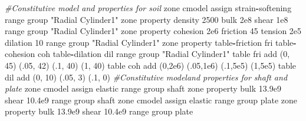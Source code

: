 \documentclass[a4paper, nobind]{templates/ociamthesis}
\newenvironment{Shaded}{\begin{snugshade}}{\end{snugshade}}
\newcommand{\BuiltInTok}[1]{#1}
\newcommand{\CommentTok}[1]{\textcolor[rgb]{0.56,0.35,0.01}{\textit{#1}}}
\newcommand{\DecValTok}[1]{\textcolor[rgb]{0.00,0.00,0.81}{#1}}
\newcommand{\FloatTok}[1]{\textcolor[rgb]{0.00,0.00,0.81}{#1}}
\newcommand{\NormalTok}[1]{#1}
\newcommand{\OperatorTok}[1]{\textcolor[rgb]{0.81,0.36,0.00}{\textbf{#1}}}
\newcommand{\StringTok}[1]{\textcolor[rgb]{0.31,0.60,0.02}{#1}}
\renewenvironment{Shaded}
{
  \vspace{10pt}%
  \begin{snugshade}%
}{%
  \end{snugshade}%
  \vspace{8pt}%
}
\begin{document}
\begin{Shaded}
\begin{Highlighting}[]
\CommentTok{\#Constitutive model and properties for soil}
\NormalTok{zone cmodel assign strain}\OperatorTok{{-}}\NormalTok{softening }\BuiltInTok{range}\NormalTok{ group }\StringTok{"Radial Cylinder1"}
\NormalTok{zone }\BuiltInTok{property}\NormalTok{ density }\DecValTok{2500}\NormalTok{ bulk }\FloatTok{2e8}\NormalTok{ shear }\FloatTok{1e8} \BuiltInTok{range}\NormalTok{ group }\StringTok{"Radial Cylinder1"}
\NormalTok{zone }\BuiltInTok{property}\NormalTok{ cohesion }\FloatTok{2e6}\NormalTok{ friction }\DecValTok{45}\NormalTok{ tension }\FloatTok{2e5}\NormalTok{ dilation }\DecValTok{10} \BuiltInTok{range}\NormalTok{ group }\StringTok{"Radial Cylinder1"}
\NormalTok{zone }\BuiltInTok{property}\NormalTok{ table}\OperatorTok{{-}}\NormalTok{friction }\StringTok{\textquotesingle{}fri\textquotesingle{}}\NormalTok{ table}\OperatorTok{{-}}\NormalTok{cohesion }\StringTok{\textquotesingle{}coh\textquotesingle{}}\NormalTok{ table}\OperatorTok{{-}}\NormalTok{dilation }\StringTok{\textquotesingle{}dil\textquotesingle{}} \BuiltInTok{range}\NormalTok{ group }\StringTok{"Radial Cylinder1"}
\NormalTok{table }\StringTok{\textquotesingle{}fri\textquotesingle{}}\NormalTok{ add (}\DecValTok{0}\NormalTok{, }\DecValTok{45}\NormalTok{) (}\FloatTok{.05}\NormalTok{, }\DecValTok{42}\NormalTok{) (}\FloatTok{.1}\NormalTok{, }\DecValTok{40}\NormalTok{) (}\DecValTok{1}\NormalTok{, }\DecValTok{40}\NormalTok{)}
\NormalTok{table }\StringTok{\textquotesingle{}coh\textquotesingle{}}\NormalTok{ add (}\DecValTok{0}\NormalTok{,}\FloatTok{2e6}\NormalTok{) (}\FloatTok{.05}\NormalTok{,}\FloatTok{1e6}\NormalTok{) (}\FloatTok{.1}\NormalTok{,}\FloatTok{5e5}\NormalTok{) (}\DecValTok{1}\NormalTok{,}\FloatTok{5e5}\NormalTok{) }
\NormalTok{table }\StringTok{\textquotesingle{}dil\textquotesingle{}}\NormalTok{ add (}\DecValTok{0}\NormalTok{, }\DecValTok{10}\NormalTok{) (}\FloatTok{.05}\NormalTok{,  }\DecValTok{3}\NormalTok{) (}\FloatTok{.1}\NormalTok{,  }\DecValTok{0}\NormalTok{) }
\CommentTok{\#Constitutive modeland properties for shaft and plate}
\NormalTok{zone cmodel assign elastic }\BuiltInTok{range}\NormalTok{ group }\StringTok{\textquotesingle{}shaft\textquotesingle{}}
\NormalTok{zone }\BuiltInTok{property}\NormalTok{ bulk }\FloatTok{13.9e9}\NormalTok{  shear }\FloatTok{10.4e9}  \BuiltInTok{range}\NormalTok{ group }\StringTok{\textquotesingle{}shaft\textquotesingle{}}
\NormalTok{zone cmodel assign elastic }\BuiltInTok{range}\NormalTok{ group }\StringTok{\textquotesingle{}plate\textquotesingle{}}
\NormalTok{zone }\BuiltInTok{property}\NormalTok{ bulk }\FloatTok{13.9e9}\NormalTok{  shear }\FloatTok{10.4e9}  \BuiltInTok{range}\NormalTok{ group }\StringTok{\textquotesingle{}plate\textquotesingle{}}
\end{Highlighting}
\end{Shaded}
\end{document}
